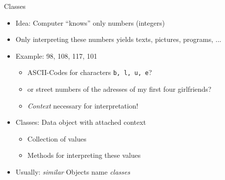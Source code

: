 \begin{frame}{Classes}
%
\begin{itemize}
\item Idea: Computer \enquote{knows} only numbers (integers)
\item Only interpreting these numbers yields texts, pictures, programs, ...
\item Example: 98, 108, 117, 101
	\begin{itemize}
	\item ASCII-Codes for characters \texttt{b, l, u, e}?
	\item or street numbers of the adresses of my first four girlfriends?
	\item \emph{Context} necessary for interpretation!
	\end{itemize}
\item Classes: Data object with attached context
	\begin{itemize}
	\item Collection of values
	\item Methods for interpreting these values
	\end{itemize}
\item Usually: \emph{similar} Objects \Thus name \emph{classes}
\end{itemize}
%
\end{frame}


